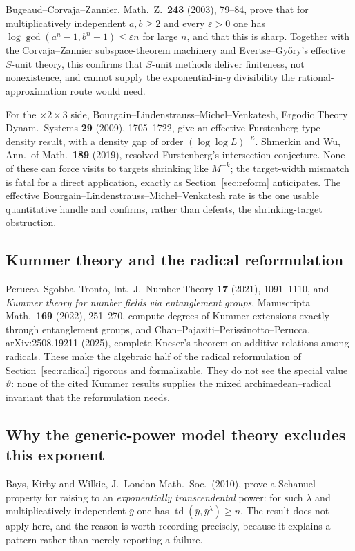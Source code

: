 \documentclass[11pt,oneside]{article}
\theoremstyle{definition}
\theoremstyle{remark}
\newcommand{\thetaq}{\vartheta}
\begin{document}
Bugeaud--Corvaja--Zannier, Math.\ Z.\ \textbf{243} (2003), 79--84, prove that for
multiplicatively independent $a,b\ge2$ and every $\varepsilon>0$ one has
$\log\gcd(a^n-1,b^n-1)\le\varepsilon n$ for large $n$, and that this is sharp.  Together with
the Corvaja--Zannier subspace-theorem machinery and Evertse--Gy\H{o}ry's effective $S$-unit
theory, this confirms that $S$-unit methods deliver finiteness, not nonexistence, and cannot
supply the exponential-in-$q$ divisibility the rational-approximation route would need.

For the $\times2\times3$ side, Bourgain--Lindenstrauss--Michel--Venkatesh, Ergodic Theory
Dynam.\ Systems \textbf{29} (2009), 1705--1722, give an effective Furstenberg-type
density result, with a density gap of order $(\log\log L)^{-\kappa}$.  Shmerkin and Wu, Ann.\
of Math.\ \textbf{189} (2019), resolved Furstenberg's intersection conjecture.  None of these
can force visits to targets shrinking like $M^{-k}$; the target-width mismatch is fatal for a
direct application, exactly as Section~\ref{sec:reform} anticipates.  The effective
Bourgain--Lindenstrauss--Michel--Venkatesh rate is the one usable quantitative handle and
confirms, rather than defeats, the shrinking-target obstruction.

\subsection{Kummer theory and the radical reformulation}

Perucca--Sgobba--Tronto, Int.\ J.\ Number Theory \textbf{17} (2021), 1091--1110, and
\emph{Kummer theory for number fields via entanglement groups}, Manuscripta Math.\ \textbf{169}
(2022), 251--270, compute degrees of Kummer extensions exactly through entanglement groups, and
Chan--Pajaziti--Perissinotto--Perucca, arXiv:2508.19211 (2025), complete Kneser's theorem on
additive relations among radicals.  These make the algebraic half of the radical reformulation
of Section~\ref{sec:radical} rigorous and formalizable.  They do not see the special value
$\thetaq$: none of the cited Kummer results supplies the mixed archimedean--radical invariant
that the reformulation needs.

\subsection{Why the generic-power model theory excludes this exponent}

Bays, Kirby and Wilkie, J.\ London Math.\ Soc.\ (2010), prove a Schanuel property for raising
to an \emph{exponentially transcendental} power: for such $\lambda$ and multiplicatively
independent $\bar y$ one has $\operatorname{td}(\bar y,\bar y^{\lambda})\ge n$.  The result does
not apply here, and the reason is worth recording precisely, because it explains a pattern
rather than merely reporting a failure.
\end{document}
